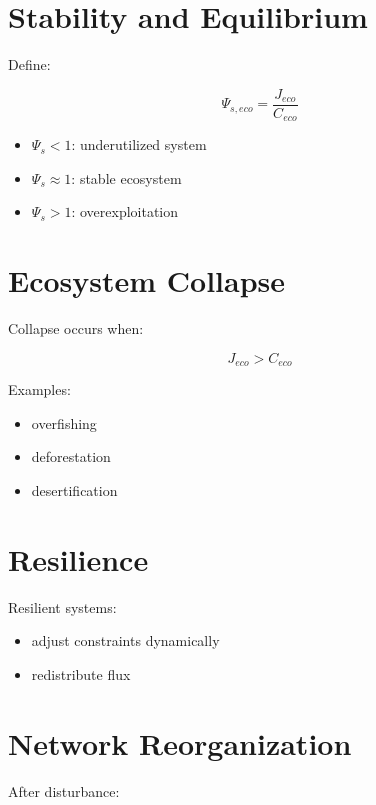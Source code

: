 \documentclass[11pt]{article}
\begin{document}
\section{Stability and Equilibrium}

Define:

\begin{equation}
\Psi_{s,eco} = \frac{J_{eco}}{C_{eco}}
\end{equation}

\begin{itemize}
    \item $\Psi_s < 1$: underutilized system
    \item $\Psi_s \approx 1$: stable ecosystem
    \item $\Psi_s > 1$: overexploitation
\end{itemize}

\section{Ecosystem Collapse}

Collapse occurs when:

\begin{equation}
J_{eco} > C_{eco}
\end{equation}

Examples:

\begin{itemize}
    \item overfishing
    \item deforestation
    \item desertification
\end{itemize}

\section{Resilience}

Resilient systems:

\begin{itemize}
    \item adjust constraints dynamically
    \item redistribute flux
\end{itemize}

\section{Network Reorganization}

After disturbance:
\end{document}
